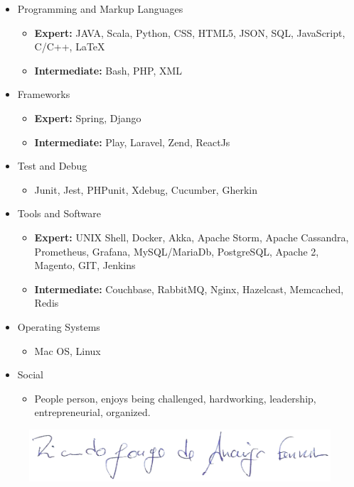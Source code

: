 \documentclass[letterpaper,11pt]{article}
\newcommand{\resitem}[1]{\item #1 \vspace{2pt}}
\begin{document}
\begin{itemize}
\item
	Programming and Markup Languages
	\begin{itemize}
		\resitem{{\bf Expert:} JAVA, Scala, Python, CSS, HTML5, JSON, SQL, JavaScript, C/C++, \LaTeX}
		\resitem{{\bf Intermediate:} Bash, PHP, XML}
    \end{itemize}
\end{itemize} 
\hspace{20pt}
\begin{itemize}
\item
	Frameworks
	\begin{itemize}
		\resitem{{\bf Expert:} Spring, Django}
		\resitem{{\bf Intermediate:} Play, Laravel, Zend, ReactJs}
	\end{itemize}
	
	\item
	Test and Debug
	\begin{itemize}
		\resitem{Junit, Jest, PHPunit, Xdebug, Cucumber, Gherkin}
	\end{itemize}

\item
	Tools and Software
	\begin{itemize}
		\resitem{{\bf Expert:} UNIX Shell, Docker, Akka, Apache Storm, Apache Cassandra, Prometheus, Grafana, MySQL/MariaDb, PostgreSQL, Apache 2, Magento, GIT, Jenkins}
		\resitem{{\bf Intermediate:} Couchbase, RabbitMQ, Nginx, Hazelcast, Memcached, Redis}
	\end{itemize}
	
	\item
	Operating Systems
	\begin{itemize}
		\resitem{Mac OS, Linux}
	\end{itemize}

	\item
	Social
	\begin{itemize}
		\resitem{People person, enjoys being challenged, hardworking, leadership, entrepreneurial, organized.}
	\end{itemize}
\end{itemize}



\vspace{5mm}

\begin{figure}[h]
\centering
{\includegraphics[scale=0.25]{img/sig.png}}
\end{figure}
\end{document}
